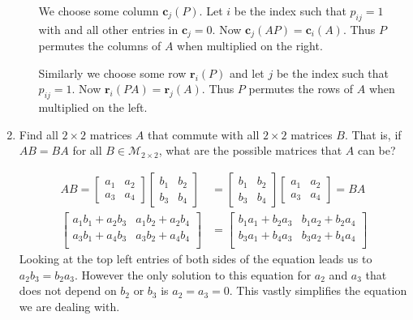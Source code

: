 \documentclass[letterpaper]{article}
\begin{document}
\begin{enumerate}
\begin{enumerate}
  We choose some column $\mathbf{c}_j(P)$.
  Let $i$ be the index such that $p_{ij}=1$ with and all other entries in $\mathbf{c}_j=0$.
  Now $\mathbf{c}_j(AP)=\mathbf{c}_i(A)$.
  Thus $P$ permutes the columns of $A$ when multiplied on the right.

  Similarly we choose some row $\mathbf{r}_i(P)$ and let $j$ be the index such that $p_{ij}=1$.
  Now $\mathbf{r}_i(PA)=\mathbf{r}_j(A)$.
  Thus $P$ permutes the rows of $A$ when multiplied on the left.
  \end{enumerate}
\setcounter{enumi}{13}
\item
Find all $2\times 2$ matrices $A$ that commute with all $2\times 2$ matrices $B$. That is, if $AB=BA$ for all $B\in \mathcal{M}_{2\times 2}$, what are the possible matrices that $A$ can be?

\begin{align*}
  AB=
  \left[\begin{array}{cc}a_1&a_2\\a_3&a_4\end{array}\right]
  \left[\begin{array}{cc}b_1&b_2\\b_3&b_4\end{array}\right]
  &=
  \left[\begin{array}{cc}b_1&b_2\\b_3&b_4\end{array}\right]
  \left[\begin{array}{cc}a_1&a_2\\a_3&a_4\end{array}\right]
  =BA\\
  \left[\begin{array}{cc}
    a_1b_1+a_2b_3&a_1b_2+a_2b_4\\
    a_3b_1+a_4b_3&a_3b_2+a_4b_4\\
  \end{array}\right]
  &=
  \left[\begin{array}{cc}
    b_1a_1+b_2a_3&b_1a_2+b_2a_4\\
    b_3a_1+b_4a_3&b_3a_2+b_4a_4\\
  \end{array}\right]
\end{align*}
Looking at the top left entries of both sides of the equation leads us to $a_2b_3=b_2a_3$. However the only solution to this equation for $a_2$ and $a_3$ that does not depend on $b_2$ or $b_3$ is $a_2=a_3=0$. This vastly simplifies the equation we are dealing with.
\begin{align*}

\end{align*}
\end{enumerate}
\end{document}
